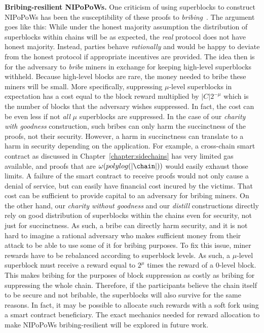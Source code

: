 \textbf{Bribing-resilient NIPoPoWs.} One criticism of using superblocks to
construct NIPoPoWs has been the susceptibility of these proofs to
\emph{bribing}~\cite{flyclient}. The argument goes like this: While under the
honest majority assumption the distribution of superblocks within chains will be
as expected, the \emph{real} protocol does not have honest majority. Instead,
parties behave \emph{rationally} and would be happy to deviate from the honest
protocol if appropriate incentives are provided. The idea then is for the
adversary to \emph{bribe} miners in exchange for keeping high-level superblocks
withheld. Because high-level blocks are rare, the money needed to bribe these
miners will be small. More specifically, suppressing $\mu$-level superblocks
in expectation has a cost equal to the block reward multiplied by
$|C|2^{-\mu}$ which is the number of blocks that the adversary wishes
suppressed. In fact, the cost can be even less if not \emph{all} $\mu$
superblocks are suppressed. In the case of our \emph{charity with goodness}
construction, such bribes can only harm the succinctness of the proofs, not
their security. However, a harm in succinctness can translate to a harm in
security depending on the application. For example, a cross-chain smart contract
as discussed in Chapter~\ref{chapter:sidechains} has very limited gas
available, and proofs that are $\omega(polylog(|\chain|))$ would easily exhaust
those limits. A failure of the smart contract to receive proofs would not only
cause a denial of service, but can easily have financial cost incured by the
victims. That cost can be sufficient to provide capital to an adversary for
bribing miners. On the other hand, our \emph{charity without goodness} and our
\emph{distill} constructions directly rely on good distribution of superblocks
within the chains even for security, not just for succinctness. As such, a bribe
can directly harm security, and it is not hard to imagine a rational adversary
who makes sufficient money from their attack to be able to use some of it for
bribing purposes. To fix this issue, miner rewards have to be rebalanced
according to superblock levels. As such, a $\mu$-level superblock must receive
a reward equal to $2^\mu$ times the reward of a $0$-level block. This makes
bribing for the purposes of block suppression as costly as bribing for
suppressing the whole chain. Therefore, if the participants believe the chain
itself to be secure and not bribable, the superblocks will also survive for the
same reasons. In fact, it may be possible to allocate such rewards with a soft
fork using a smart contract beneficiary. The exact mechanics needed for reward
allocation to make NIPoPoWs bribing-resilient will be explored in future work.
